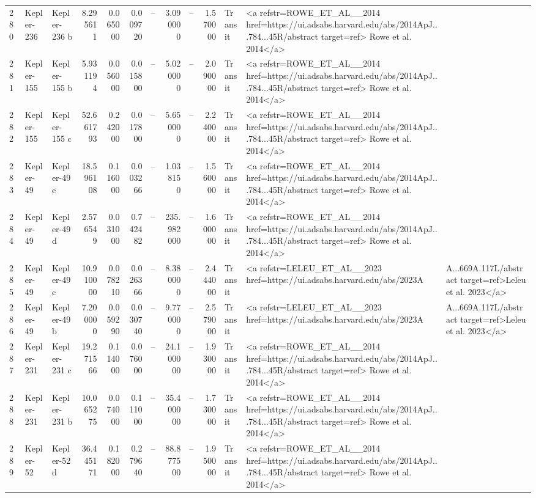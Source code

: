 \begin{tabular}{lllrrrrrrrll}
280 & Kepler-236 & Kepler-236 b & 8.295611 & 0.065000 & 0.009720 & -- & 3.090000 & -- & 1.570000 & Transit & <a refstr=ROWE_ET_AL__2014 href=https://ui.adsabs.harvard.edu/abs/2014ApJ...784...45R/abstract target=ref> Rowe et al. 2014</a> \\
281 & Kepler-155 & Kepler-155 b & 5.931194 & 0.056000 & 0.015800 & -- & 5.020000 & -- & 2.090000 & Transit & <a refstr=ROWE_ET_AL__2014 href=https://ui.adsabs.harvard.edu/abs/2014ApJ...784...45R/abstract target=ref> Rowe et al. 2014</a> \\
282 & Kepler-155 & Kepler-155 c & 52.661793 & 0.242000 & 0.017800 & -- & 5.650000 & -- & 2.240000 & Transit & <a refstr=ROWE_ET_AL__2014 href=https://ui.adsabs.harvard.edu/abs/2014ApJ...784...45R/abstract target=ref> Rowe et al. 2014</a> \\
283 & Kepler-49 & Kepler-49 e & 18.596108 & 0.116000 & 0.003266 & -- & 1.038150 & -- & 1.560000 & Transit & <a refstr=ROWE_ET_AL__2014 href=https://ui.adsabs.harvard.edu/abs/2014ApJ...784...45R/abstract target=ref> Rowe et al. 2014</a> \\
284 & Kepler-49 & Kepler-49 d & 2.576549 & 0.031000 & 0.742482 & -- & 235.982000 & -- & 1.600000 & Transit & <a refstr=ROWE_ET_AL__2014 href=https://ui.adsabs.harvard.edu/abs/2014ApJ...784...45R/abstract target=ref> Rowe et al. 2014</a> \\
285 & Kepler-49 & Kepler-49 c & 10.910000 & 0.078210 & 0.026366 & -- & 8.380000 & -- & 2.444000 & Transit & <a refstr=LELEU_ET_AL__2023 href=https://ui.adsabs.harvard.edu/abs/2023A&A...669A.117L/abstract target=ref>Leleu et al. 2023</a> \\
286 & Kepler-49 & Kepler-49 b & 7.200000 & 0.059290 & 0.030740 & -- & 9.770000 & -- & 2.579000 & Transit & <a refstr=LELEU_ET_AL__2023 href=https://ui.adsabs.harvard.edu/abs/2023A&A...669A.117L/abstract target=ref>Leleu et al. 2023</a> \\
287 & Kepler-231 & Kepler-231 c & 19.271566 & 0.114000 & 0.076000 & -- & 24.100000 & -- & 1.930000 & Transit & <a refstr=ROWE_ET_AL__2014 href=https://ui.adsabs.harvard.edu/abs/2014ApJ...784...45R/abstract target=ref> Rowe et al. 2014</a> \\
288 & Kepler-231 & Kepler-231 b & 10.065275 & 0.074000 & 0.111000 & -- & 35.400000 & -- & 1.730000 & Transit & <a refstr=ROWE_ET_AL__2014 href=https://ui.adsabs.harvard.edu/abs/2014ApJ...784...45R/abstract target=ref> Rowe et al. 2014</a> \\
289 & Kepler-52 & Kepler-52 d & 36.445171 & 0.182000 & 0.279640 & -- & 88.877500 & -- & 1.950000 & Transit & <a refstr=ROWE_ET_AL__2014 href=https://ui.adsabs.harvard.edu/abs/2014ApJ...784...45R/abstract target=ref> Rowe et al. 2014</a> \\

\end{tabular}
